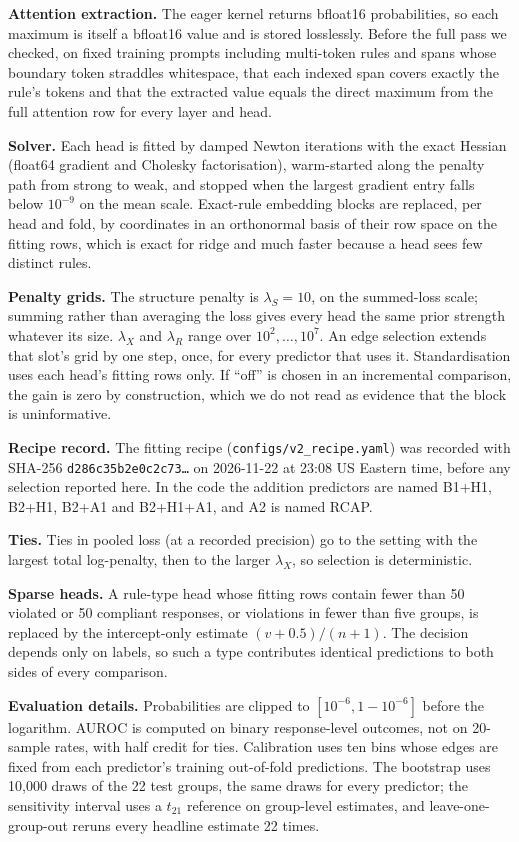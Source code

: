 \documentclass{article}
\begin{document}
\textbf{Attention extraction.} The eager kernel returns bfloat16 probabilities, so each maximum is itself a bfloat16
value and is stored losslessly. Before the full pass we checked, on fixed training prompts including multi-token rules
and spans whose boundary token straddles whitespace, that each indexed span covers exactly the rule's tokens and that
the extracted value equals the direct maximum from the full attention row for every layer and head.

\textbf{Solver.} Each head is fitted by damped Newton iterations with the exact Hessian (float64 gradient and Cholesky
factorisation), warm-started along the penalty path from strong to weak, and stopped when the largest gradient entry
falls below $10^{-9}$ on the mean scale. Exact-rule embedding blocks are replaced, per head and fold, by coordinates in
an orthonormal basis of their row space on the fitting rows, which is exact for ridge and much faster because a head
sees few distinct rules.

\textbf{Penalty grids.} The structure penalty is $\lambda_S=10$, on the
summed-loss scale; summing rather than averaging the loss gives every head the same prior strength whatever its size.
$\lambda_X$ and $\lambda_R$ range over $10^2,\dots,10^7$. An edge
selection extends that slot's grid by one step, once, for every predictor that uses it. Standardisation uses each
head's fitting rows only. If ``off'' is chosen in an incremental comparison, the gain is zero by construction, which we
do not read as evidence that the block is uninformative.

\textbf{Recipe record.} The fitting recipe (\texttt{configs/v2\_recipe.yaml}) was recorded with SHA-256
\texttt{d286c35b2e0c2c73\ldots} on 2026-11-22 at 23:08 US Eastern time, before any selection reported here. In the
code the addition predictors are named B1+H1, B2+H1, B2+A1 and B2+H1+A1, and A2 is named RCAP.

\textbf{Ties.} Ties in pooled loss (at a recorded precision) go to the setting with the largest total log-penalty, then
to the larger $\lambda_X$, so selection is deterministic.

\textbf{Sparse heads.} A rule-type head whose fitting rows contain fewer than 50 violated or 50 compliant responses, or
violations in fewer than five groups, is replaced by the intercept-only estimate $(v+0.5)/(n+1)$. The decision depends
only on labels, so such a type contributes identical predictions to both sides of every comparison.

\textbf{Evaluation details.} Probabilities are clipped to $[10^{-6},1-10^{-6}]$ before the logarithm. AUROC is
computed on binary response-level outcomes, not on 20-sample rates, with half credit for ties. Calibration uses ten
bins whose edges are fixed from each predictor's training out-of-fold predictions. The bootstrap uses 10,000 draws of
the 22 test groups, the same draws for every predictor; the sensitivity interval uses a $t_{21}$ reference on
group-level estimates, and leave-one-group-out reruns every headline estimate 22 times.
\end{document}
